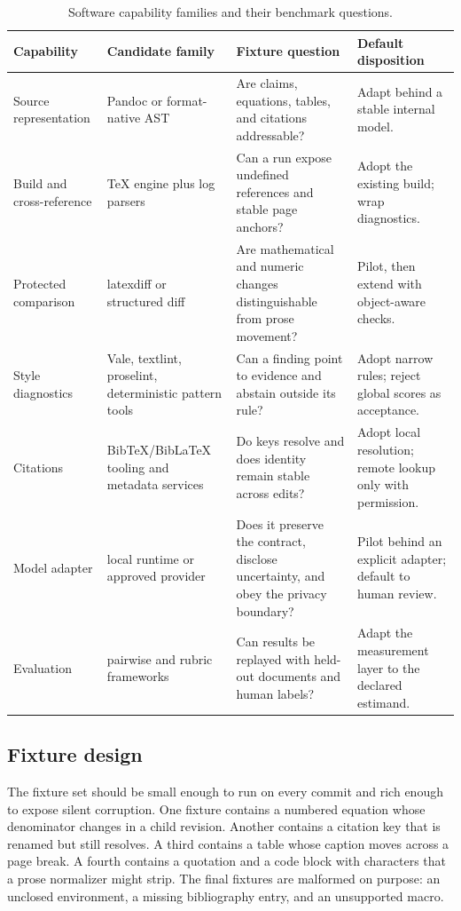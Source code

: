 \begin{table}[H]
\centering
\small
\begin{tabularx}{\textwidth}{@{}p{}p{}p{}L@{}}
\toprule
Capability & Candidate family & Fixture question & Default disposition \\
\midrule
Source representation & Pandoc or format-native AST & Are claims, equations,
tables, and citations addressable? & Adapt behind a stable internal model. \\
Build and cross-reference & TeX engine plus log parsers & Can a run expose
undefined references and stable page anchors? & Adopt the existing build;
wrap diagnostics. \\
Protected comparison & latexdiff or structured diff & Are mathematical and
numeric changes distinguishable from prose movement? & Pilot, then extend with
object-aware checks. \\
Style diagnostics & Vale, textlint, proselint, deterministic pattern tools &
Can a finding point to evidence and abstain outside its rule? & Adopt narrow
rules; reject global scores as acceptance. \\
Citations & BibTeX/BibLaTeX tooling and metadata services & Do keys resolve and
does identity remain stable across edits? & Adopt local resolution; remote
lookup only with permission. \\
Model adapter & local runtime or approved provider & Does it preserve the
contract, disclose uncertainty, and obey the privacy boundary? & Pilot behind
an explicit adapter; default to human review. \\
Evaluation & pairwise and rubric frameworks & Can results be replayed with
held-out documents and human labels? & Adapt the measurement layer to the
declared estimand. \\
\bottomrule
\end{tabularx}
\caption{Software capability families and their benchmark questions.}
\label{tab:software-capabilities}
\end{table}

\subsection{Fixture design}

The fixture set should be small enough to run on every commit and rich enough
to expose silent corruption. One fixture contains a numbered equation whose
denominator changes in a child revision. Another contains a citation key that
is renamed but still resolves. A third contains a table whose caption moves
across a page break. A fourth contains a quotation and a code block with
characters that a prose normalizer might strip. The final fixtures are
malformed on purpose: an unclosed environment, a missing bibliography entry,
and an unsupported macro.

